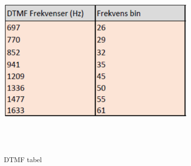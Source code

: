 \begin{figure}[ht]
	\centering
	\includegraphics[width=10cm,height=10cm,keepaspectratio]{pictures/DTMFtabel.png}
	\caption{DTMF tabel}
	\label{fig:tabel}
\end{figure}

